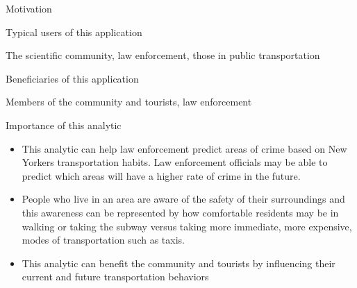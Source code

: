 \documentclass[10pt,ignorenonframetext,]{beamer}
\providecommand{\tightlist}{%
  \setlength{\itemsep}{0pt}\setlength{\parskip}{0pt}}
\begin{document}
\begin{frame}{%
\protect\hypertarget{motivation}{%
Motivation}}

\begin{block}{Typical users of this application}

The scientific community, law enforcement, those in public
transportation

\end{block}

\begin{block}{Beneficiaries of this application}

Members of the community and tourists, law enforcement

\end{block}

\begin{block}{Importance of this analytic}

\begin{itemize}
\tightlist
\item
  This analytic can help law enforcement predict areas of crime based on
  New Yorkers transportation habits. Law enforcement officials may be
  able to predict which areas will have a higher rate of crime in the
  future.
\item
  People who live in an area are aware of the safety of their
  surroundings and this awareness can be represented by how comfortable
  residents may be in walking or taking the subway versus taking more
  immediate, more expensive, modes of transportation such as taxis.
\item
  This analytic can benefit the community and tourists by influencing
  their current and future transportation behaviors
\end{itemize}

\end{block}

\end{frame}
\end{document}
